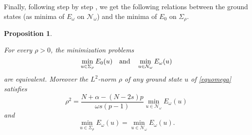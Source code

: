 \documentclass[10pt]{amsart}
\numberwithin{equation}{section}
\newtheorem{proposition}[theorem]{Proposition}
\begin{document}
\noindent Finally, following step by step \cite[Proof of Lemma 2.6]{CSS}, we get the following relations between the ground states 
(as minima of $E_\omega$ on $\mathcal{N}_\omega$) and the minima of $E_0$ on $\Sigma_\rho$.
\begin{proposition}\label{PropoPietro}
	
	For every $\rho >0$, the minimization problems 
	\[
	\min_{u\in\Sigma_\rho} E_0(u)
	\quad
	\hbox{and}
	\quad
	\min_{u\in\mathcal{N}_\omega} E_\omega(u)
	\]
	are equivalent.
	Moreover the $L^2$-norm $\rho$ of any ground state $u$ of \eqref{equomega} satisfies 
	\begin{equation*}
	
	\rho^2= \frac{N+\alpha - (N-2s)p}{\omega s (p-1)}\min_{u\in\mathcal{N}_\omega} E_\omega(u)
	\end{equation*}
	and
	\[
	\min_{u\in\Sigma_\rho} E_\omega(u)
	=
	\min_{u\in\mathcal{N}_\omega} E_\omega(u).
	\]
\end{proposition}
\end{document}
